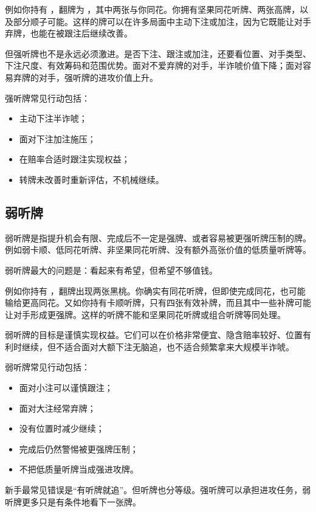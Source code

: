 例如你持有 ，翻牌为 ，其中两张与你同花。你拥有坚果同花听牌、两张高牌，以及部分顺子可能。这样的牌可以在许多局面中主动下注或加注，因为它既能让对手弃牌，也能在被跟注后继续改善。

但强听牌也不是永远必须激进。是否下注、跟注或加注，还要看位置、对手类型、下注尺度、有效筹码和范围优势。面对不爱弃牌的对手，半诈唬价值下降；面对容易弃牌的对手，强听牌的进攻价值上升。

强听牌常见行动包括：

\begin{itemize}
\item 主动下注半诈唬；
\item 面对下注加注施压；
\item 在赔率合适时跟注实现权益；
\item 转牌未改善时重新评估，不机械继续。
\end{itemize}

\subsection{弱听牌}

弱听牌是指提升机会有限、完成后不一定是强牌、或者容易被更强听牌压制的牌。例如弱卡顺、低同花听牌、非坚果同花听牌、没有额外高张价值的低质量听牌等。

弱听牌最大的问题是：看起来有希望，但希望不够值钱。

例如你持有 ，翻牌出现两张黑桃。你确实有同花听牌，但即使完成同花，也可能输给更高同花。又如你持有卡顺听牌，只有四张有效补牌，而且其中一些补牌可能让对手形成更强牌。这样的听牌不能和坚果同花听牌或组合听牌等同处理。

弱听牌的目标是谨慎实现权益。它们可以在价格非常便宜、隐含赔率较好、位置有利时继续，但不适合面对大额下注无脑追，也不适合频繁拿来大规模半诈唬。

弱听牌常见行动包括：

\begin{itemize}
\item 面对小注可以谨慎跟注；
\item 面对大注经常弃牌；
\item 没有位置时减少继续；
\item 完成后仍然警惕被更强牌压制；
\item 不把低质量听牌当成强进攻牌。
\end{itemize}

新手最常见错误是“有听牌就追”。但听牌也分等级。强听牌可以承担进攻任务，弱听牌更多只是有条件地看下一张牌。

